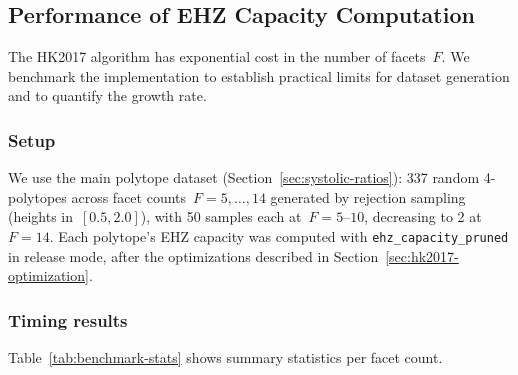 %

\subsection{Performance of EHZ Capacity Computation}
\label{sec:benchmark}

The HK2017 algorithm has exponential cost in the number of facets~$F$.
We benchmark the implementation to establish practical limits for dataset
generation and to quantify the growth rate.

\subsubsection*{Setup}

We use the main polytope dataset (Section~\ref{sec:systolic-ratios}): 337
random 4-polytopes across facet counts~$F = 5, \ldots, 14$ generated by
rejection sampling (heights in~$[0.5, 2.0]$), with 50 samples each
at~$F = 5$--$10$, decreasing to 2 at~$F = 14$. Each polytope's EHZ capacity
was computed with \texttt{ehz\_capacity\_pruned} in release mode, after the
optimizations described in Section~\ref{sec:hk2017-optimization}.

\subsubsection*{Timing results}

Table~\ref{tab:benchmark-stats} shows summary statistics per facet count.

